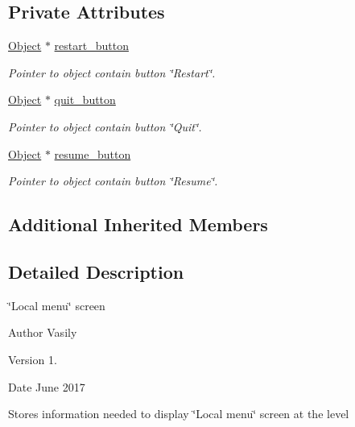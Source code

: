 \subsection*{Private Attributes}
\begin{DoxyCompactItemize}
\item 
\mbox{\label{class_local_menu_ae41e7879af3597e9813855ead692ac54}} 
\hyperlink{class_object}{Object} $\ast$ \hyperlink{class_local_menu_ae41e7879af3597e9813855ead692ac54}{restart\+\_\+button}
\begin{DoxyCompactList}\small\item\em Pointer to object contain button \char`\"{}\+Restart\char`\"{}. \end{DoxyCompactList}\item 
\mbox{\label{class_local_menu_a8a16de3ea6b9bb26b14cbbbaac7ff877}} 
\hyperlink{class_object}{Object} $\ast$ \hyperlink{class_local_menu_a8a16de3ea6b9bb26b14cbbbaac7ff877}{quit\+\_\+button}
\begin{DoxyCompactList}\small\item\em Pointer to object contain button \char`\"{}\+Quit\char`\"{}. \end{DoxyCompactList}\item 
\mbox{\label{class_local_menu_ad7c83497bd1737707763c9350d99ab44}} 
\hyperlink{class_object}{Object} $\ast$ \hyperlink{class_local_menu_ad7c83497bd1737707763c9350d99ab44}{resume\+\_\+button}
\begin{DoxyCompactList}\small\item\em Pointer to object contain button \char`\"{}\+Resume\char`\"{}. \end{DoxyCompactList}\end{DoxyCompactItemize}
\subsection*{Additional Inherited Members}


\subsection{Detailed Description}
\char`\"{}\+Local menu\char`\"{} screen 

\begin{DoxyAuthor}{Author}
Vasily 
\end{DoxyAuthor}
\begin{DoxyVersion}{Version}
1. 
\end{DoxyVersion}
\begin{DoxyDate}{Date}
June 2017
\end{DoxyDate}
Stores information needed to display \char`\"{}\+Local menu\char`\"{} screen at the level 

